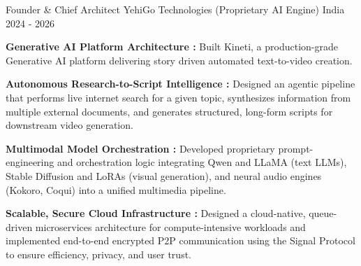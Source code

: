 \begin{cventries}
	\cventry
	{Founder \& Chief Architect} %
	{YehiGo Technologies (Proprietary AI Engine)} %
	{India} %
	{2024 - 2026} %
	{
		\begin{cvitems} %
			\item {\textbf{Generative AI Platform Architecture :} Built Kineti, a production-grade Generative AI platform delivering story driven automated text-to-video creation.}
			\item {\textbf{Autonomous Research-to-Script Intelligence :} Designed an agentic pipeline that performs live internet search for a given topic, synthesizes information from multiple external documents, and generates structured, long-form scripts for downstream video generation.}
			\item {\textbf{Multimodal Model Orchestration :} Developed proprietary prompt-engineering and orchestration logic integrating Qwen and LLaMA (text LLMs), Stable Diffusion and LoRAs (visual generation), and neural audio engines (Kokoro, Coqui) into a unified multimedia pipeline.}
			 \item{\textbf{Scalable, Secure Cloud Infrastructure :} Designed a cloud-native, queue-driven microservices architecture for compute-intensive workloads and implemented end-to-end encrypted P2P communication using the Signal Protocol to ensure efficiency, privacy, and user trust.}
		\end{cvitems}
	}




\end{cventries}

